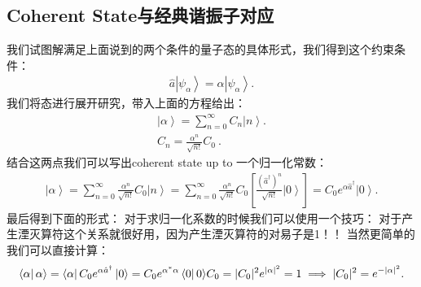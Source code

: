 \subsection{Coherent State与经典谐振子对应}


我们试图解满足上面说到的两个条件的量子态的具体形式，我们得到这个约束条件：
\begin{align}
  \hat{a}\left|\psi_{\alpha}\right\rangle=\alpha\left|\psi_{\alpha}\right\rangle.
\end{align}
我们将态进行展开研究，带入上面的方程给出：
\begin{align}
  \left|\alpha\right\rangle=\sum_{n=0}^{\infty}C_{n}\left|n\right\rangle.\\
  C_n=\frac{\alpha^n}{\sqrt{n!}}C_0\mathrm{~.}
\end{align}
结合这两点我们可以写出coherent state up to 一个归一化常数：
\begin{align}
  \left|\alpha\right\rangle=\sum_{n=0}^{\infty}\frac{\alpha^{n}}{\sqrt{n!}}C_{0}\left|n\right\rangle=\sum_{n=0}^{\infty}\frac{\alpha^{n}}{\sqrt{n!}}C_{0}\left[\frac{\left(\hat{a}^{\dagger}\right)^{n}}{\sqrt{n!}}\left|0\right\rangle\right]=C_{0}e^{\alpha\hat{a}^{\dagger}}\left|0\right\rangle.
\end{align}
最后得到下面的形式：
对于求归一化系数的时候我们可以使用一个技巧：
对于产生湮灭算符这个关系就很好用，因为产生湮灭算符的对易子是1！！
当然更简单的我们可以直接计算：
\begin{align}
  \bra{\alpha}\alpha\rangle = \bra{\alpha} C_0 e^{\alpha
  \hat{a}^\dagger} \ket{0} = C_0 e^{\alpha^* \alpha} \bra{0} 0
  \rangle C_0 = |C_0|^2 e^{|\alpha|^2} = 1 \implies |C_0|^2 = e^{-|\alpha|^2}.
\end{align}

\bigskip
{}

